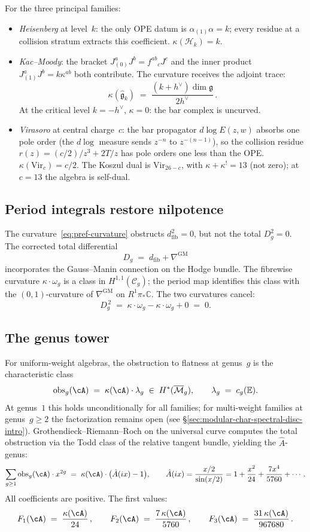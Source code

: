 For the three principal families:
\begin{itemize}
\item \emph{Heisenberg} at level~$k$: the only OPE datum is
$\alpha_{(1)}\alpha=k$; every residue at a collision
stratum extracts this coefficient.
$\kappa(\mathcal H_k)=k$.

\item \emph{Kac--Moody}: the bracket
$J^a_{(0)}J^b=f^{ab}{}_{c}J^c$ and the inner product
$J^a_{(1)}J^b=k\kappa^{ab}$ both contribute. The
curvature receives the adjoint trace:
\[
\kappa(\widehat{\mathfrak g}_k)
\;=\;
\frac{(k+h^\vee)\dim\mathfrak g}{2h^\vee}\,.
\]
At the critical level $k=-h^\vee$, $\kappa=0$: the bar complex
is uncurved.

\item \emph{Virasoro} at central charge~$c$:
the bar propagator $d\log E(z,w)$ absorbs one pole order
(the $d\log$ measure sends $z^{-n}$ to $z^{-(n-1)}$), so the
collision residue $r(z)=(c/2)/z^3+2T/z$ has pole orders one
less than the OPE.
$\kappa(\mathrm{Vir}_c)=c/2$.
The Koszul dual is $\mathrm{Vir}_{26-c}$, with
$\kappa+\kappa^!=13$ (not zero); at $c=13$
the algebra is self-dual.
\end{itemize}

\subsection*{Period integrals restore nilpotence}

The curvature~\eqref{eq:pref-curvature} obstructs
$d_{\mathrm{fib}}^2=0$, but not the total $D_g^2=0$.
The corrected total differential
\[
D_g\;=\;d_{\mathrm{fib}}+\nabla^{\mathrm{GM}}
\]
incorporates the Gauss--Manin connection on the Hodge bundle.
The fibrewise curvature $\kappa\cdot\omega_g$ is a class in
$H^{1,1}(\mathcal C_g)$; the period map identifies this class
with the $(0,1)$-curvature of $\nabla^{\mathrm{GM}}$ on
$R^1\pi_*\mathbb C$. The two curvatures cancel:
\[
D_g^{\,2}
\;=\;
\kappa\cdot\omega_g-\kappa\cdot\omega_g+0
\;=\;0.
\]

\subsection*{The genus tower}

For uniform-weight algebras, the obstruction to flatness at
genus~$g$ is the characteristic class
\[
\mathrm{obs}_g(\cA)
\;=\;
\kappa(\cA)\cdot\lambda_g
\;\in\;
H^*(\overline{\mathcal M}_g),
\qquad
\lambda_g\;=\;c_g(\mathbb E).
\]
At genus~$1$ this holds unconditionally for all families; for
multi-weight families at genus~$g \geq 2$ the factorization
remains open
\textup{(}see \S\textup{\ref{sec:modular-char-spectral-disc-intro}}\textup{)}.
Grothendieck--Riemann--Roch on the universal curve computes
the total obstruction via the Todd class of the relative
tangent bundle, yielding the $\hat A$-genus:
\[
\sum_{g\ge 1}\mathrm{obs}_g(\cA)\cdot x^{2g}
\;=\;
\kappa(\cA)\cdot\bigl(\hat A(ix)-1\bigr),
\qquad
\hat A(ix)=\frac{x/2}{\sin(x/2)}
=1+\frac{x^2}{24}+\frac{7x^4}{5760}+\cdots\,.
\]
All coefficients are positive. The first values:
\[
F_1(\cA)
\;=\;
\frac{\kappa(\cA)}{24}\,,
\qquad
F_2(\cA)
\;=\;
\frac{7\,\kappa(\cA)}{5760}\,,
\qquad
F_3(\cA)
\;=\;
\frac{31\,\kappa(\cA)}{967680}\,.
\]

